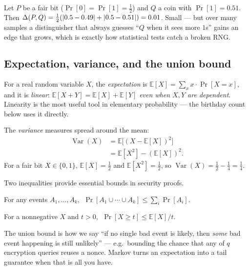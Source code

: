 \begin{example}
\label{ch41:ex-bias}
Let $P$ be a fair bit ($\Pr[0]=\Pr[1]=\tfrac12$) and $Q$ a coin with
$\Pr[1]=0.51$. Then $\Delta(P,Q)=\tfrac12(\lvert0.5-0.49\rvert+\lvert0.5-0.51\rvert)=0.01$.
Small --- but over many samples a distinguisher that always guesses ``$Q$ when it
sees more $1$s'' gains an edge that grows, which is exactly how statistical tests
catch a broken RNG.
\end{example}

\subsection{Expectation, variance, and the union bound}
\label{ch41:expectation}

For a real random variable $X$, the \emph{expectation} is $\mathbb{E}[X] =
\sum_x x\cdot\Pr[X=x]$, and it is \emph{linear}: $\mathbb{E}[X+Y]=\mathbb{E}[X]
+\mathbb{E}[Y]$ \emph{even when $X,Y$ are dependent}. Linearity is the most
useful tool in elementary probability --- the birthday count below uses it directly.

The \emph{variance} measures spread around the mean:
\begin{align*}
\operatorname{Var}(X) &= \mathbb{E}\big[(X-\mathbb{E}[X])^2\big] \\
                      &= \mathbb{E}[X^2] - (\mathbb{E}[X])^2.
\end{align*}
For a fair bit $X \in \{0,1\}$, $\mathbb{E}[X] = \tfrac12$ and $\mathbb{E}[X^2] = \tfrac12$, so
$\operatorname{Var}(X) = \tfrac12 - \tfrac14 = \tfrac14$.

Two inequalities provide essential bounds in security proofs.

\begin{theorem}
\label{ch41:thm-union}
For any events $A_1,\dots,A_k$, $\;\Pr[A_1\cup\cdots\cup A_k]\le\sum_{i}\Pr[A_i]$.
\end{theorem}

\begin{theorem}
\label{ch41:thm-markov}
For a nonnegative $X$ and $t>0$, $\;\Pr[X\ge t]\le \mathbb{E}[X]/t$.
\end{theorem}

The union bound is how we say ``if no single bad event is likely, then \emph{some}
bad event happening is still unlikely'' --- e.g.\ bounding the chance that any of
$q$ encryption queries reuses a nonce. Markov turns an expectation into a tail
guarantee when that is all you have.

